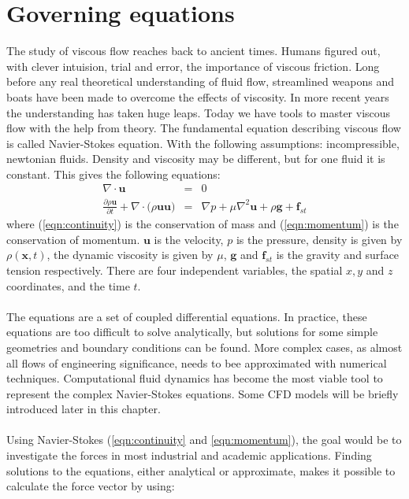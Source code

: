 \documentclass[a4paper, 12pt]{report}
\begin{document}
\section{Governing equations}
The study of viscous flow reaches back to ancient times. Humans figured out, with clever intuision, trial and error, the importance of viscous friction. Long before any real theoretical understanding of fluid flow, streamlined weapons and boats have been made to overcome the effects of viscosity. In more recent years the understanding has taken huge leaps. Today we have tools to master viscous flow with the help from theory. The fundamental equation describing viscous flow is called Navier-Stokes equation\cite{White}. With the following assumptions: incompressible, newtonian fluids. Density and viscosity may be different, but for one fluid it is constant. This gives the following equations:
\begin{eqnarray}
\label{eqn:continuity}
\nabla \cdot \mathbf{u} &=& 0 \\ 
\label{eqn:momentum}
\frac{\partial \rho \mathbf{u}}{\partial t} + \nabla \cdot \big(\rho \mathbf{u} \mathbf{u}\big) &=& \nabla p + \mu \nabla^2 \mathbf{u} + \rho\mathbf{g} + \mathbf{f}_{st} 
\end{eqnarray}
where (\ref{eqn:continuity}) is the conservation of mass and (\ref{eqn:momentum}) is the conservation of momentum. $\mathbf{u}$ is the velocity, $p$ is the pressure, density is given by $\rho(\mathbf{x},t)$, the dynamic viscosity is given by $\mu$, $\mathbf{g}$ and $\mathbf{f}_{st}$ is the gravity and surface tension respectively. There are four independent variables, the spatial $x, y$ and $z$ coordinates, and the time $t$.\\
\\
The equations are a set of coupled differential equations. In practice, these equations are too difficult to solve analytically, but solutions for some simple geometries and boundary conditions can be found. More complex cases, as almost all flows of engineering significance, needs to bee approximated with numerical techniques. Computational fluid dynamics has become the most viable tool to represent the complex Navier-Stokes equations. Some CFD models will be briefly introduced later in this chapter.\\
\\
Using Navier-Stokes (\ref{eqn:continuity} and \ref{eqn:momentum}), the goal would be to investigate the forces in most industrial and academic applications. Finding solutions to the equations, either analytical or approximate, makes it possible to calculate the force vector by using:
\end{document}
